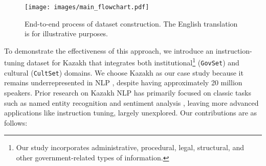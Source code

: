 \begin{figure*}[h!]
    \centering
    \texttt{[image: images/main\_flowchart.pdf]} %
    \caption{End-to-end process of dataset construction. The English translation is for illustrative purposes.}
    \label{fig:pdf-image}
\end{figure*}

To demonstrate the effectiveness of this approach, we introduce an instruction-tuning dataset for Kazakh that integrates both institutional\footnote{Our study incorporates administrative, procedural, legal, structural, and other government-related types of information.} (\texttt{GovSet}) and cultural (\texttt{CultSet}) domains. We choose Kazakh as our case study because it remains underrepresented in NLP \citep{joshi-etal-2020-state}, despite having approximately 20 million speakers. Prior research on Kazakh NLP has primarily focused on classic tasks such as named entity recognition \cite{yeshpanov-etal-2022-kaznerd} and sentiment analysis \cite{yeshpanov2024kazsandra}, leaving more advanced applications like instruction tuning, largely unexplored. 
% 
Our contributions are as follows:%
